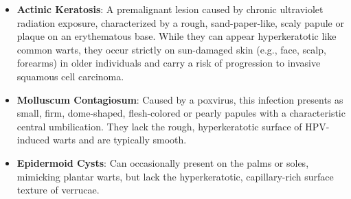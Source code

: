 \begin{itemize}
    \item \textbf{Actinic Keratosis}: A premalignant lesion caused by chronic ultraviolet radiation exposure, characterized by a rough, sand-paper-like, scaly papule or plaque on an erythematous base. While they can appear hyperkeratotic like common warts, they occur strictly on sun-damaged skin (e.g., face, scalp, forearms) in older individuals and carry a risk of progression to invasive squamous cell carcinoma.
    \item \textbf{Molluscum Contagiosum}: Caused by a poxvirus, this infection presents as small, firm, dome-shaped, flesh-colored or pearly papules with a characteristic central umbilication. They lack the rough, hyperkeratotic surface of HPV-induced warts and are typically smooth.
    \item \textbf{Epidermoid Cysts}: Can occasionally present on the palms or soles, mimicking plantar warts, but lack the hyperkeratotic, capillary-rich surface texture of verrucae.
\end{itemize}

